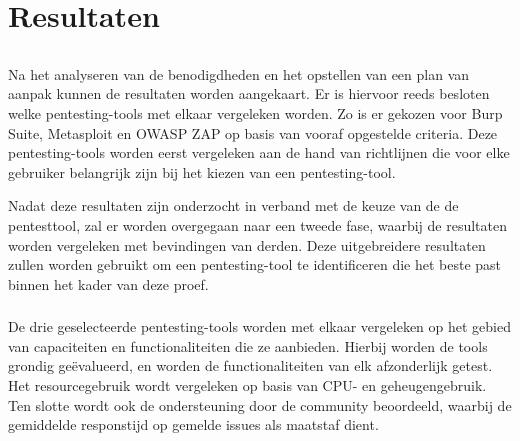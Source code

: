 
\chapter{Resultaten}%
\label{ch:resultaten}

\section{}
Na het analyseren van de benodigdheden en het opstellen van een plan van aanpak kunnen de resultaten worden aangekaart. Er is 
hiervoor reeds besloten welke pentesting-tools met elkaar vergeleken worden. Zo is er gekozen voor Burp Suite, Metasploit en 
OWASP ZAP op basis van vooraf opgestelde criteria. Deze pentesting-tools worden eerst vergeleken aan de hand van richtlijnen 
die voor elke gebruiker belangrijk zijn bij het kiezen van een pentesting-tool.

Nadat deze resultaten zijn onderzocht in verband met de keuze van de de pentesttool, zal er worden overgegaan naar een tweede 
fase, waarbij de resultaten worden vergeleken met bevindingen van derden. Deze uitgebreidere resultaten zullen worden gebruikt 
om een pentesting-tool te identificeren die het beste past binnen het kader van deze proef.

\subsection{}
De drie geselecteerde pentesting-tools worden met elkaar vergeleken op het gebied van capaciteiten en functionaliteiten die 
ze aanbieden. Hierbij worden de tools grondig geëvalueerd, en worden de functionaliteiten van elk afzonderlijk getest. Het 
resourcegebruik wordt vergeleken op basis van CPU- en geheugengebruik. Ten slotte wordt ook de ondersteuning door de 
community beoordeeld, waarbij de gemiddelde responstijd op gemelde issues als maatstaf dient.

